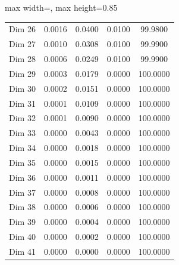 \begin{table}[H]
\begin{adjustbox}{max width=\textwidth, max height=0.85\textheight}
\begin{tabular}{|c|c|c|c|c|}
Dim 26 & 0.0016 & 0.0400 & 0.0100 & 99.9800 \\
Dim 27 & 0.0010 & 0.0308 & 0.0100 & 99.9900 \\
Dim 28 & 0.0006 & 0.0249 & 0.0100 & 99.9900 \\
Dim 29 & 0.0003 & 0.0179 & 0.0000 & 100.0000 \\
Dim 30 & 0.0002 & 0.0151 & 0.0000 & 100.0000 \\
Dim 31 & 0.0001 & 0.0109 & 0.0000 & 100.0000 \\
Dim 32 & 0.0001 & 0.0090 & 0.0000 & 100.0000 \\
Dim 33 & 0.0000 & 0.0043 & 0.0000 & 100.0000 \\
Dim 34 & 0.0000 & 0.0018 & 0.0000 & 100.0000 \\
Dim 35 & 0.0000 & 0.0015 & 0.0000 & 100.0000 \\
Dim 36 & 0.0000 & 0.0011 & 0.0000 & 100.0000 \\
Dim 37 & 0.0000 & 0.0008 & 0.0000 & 100.0000 \\
Dim 38 & 0.0000 & 0.0006 & 0.0000 & 100.0000 \\
Dim 39 & 0.0000 & 0.0004 & 0.0000 & 100.0000 \\
Dim 40 & 0.0000 & 0.0002 & 0.0000 & 100.0000 \\
Dim 41 & 0.0000 & 0.0000 & 0.0000 & 100.0000 \\
\hline
\end{tabular}
\end{adjustbox}
\end{table}